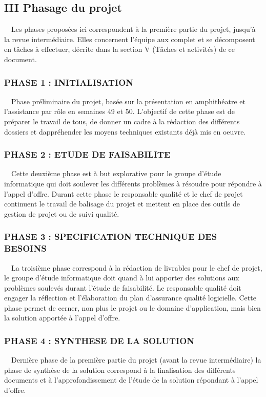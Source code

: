 \documentclass{article}
\begin{document}
\subsection[III Phasage du projet]{III Phasage du projet}
\ \ Les phases proposées ici correspondent à la première partie du
projet, jusqu’à la revue intermédiaire. Elles concernent l’équipe aux
complet et se décomposent en tâches à effectuer, décrite dans la
section V (Tâches et activités) de ce document.

\subsubsection[PHASE 1 : INITIALISATION]{PHASE 1 : INITIALISATION}
\ \ Phase préliminaire du projet, basée sur la présentation en
amphithéatre et l’assistance par rôle en semaines 49 et 50. L’objectif
de cette phase est de préparer le travail de tous, de donner un cadre à
la rédaction des différents dossiers et d{\textquotesingle}appréhender
les moyens techniques existants déjà mis en oeuvre.

\subsubsection[PHASE 2 : ETUDE DE FAISABILITE]{PHASE 2 : ETUDE DE
FAISABILITE}
\ \ Cette deuxième phase est à but explorative pour le groupe d’étude
informatique qui doit soulever les différents problèmes à résoudre pour
répondre à l’appel d’offre. Durant cette phase le responsable qualité
et le chef de projet continuent le travail de balisage du projet et
mettent en place des outils de gestion de projet ou de suivi qualité.

\subsubsection[PHASE 3 : SPECIFICATION TECHNIQUE DES BESOINS]{PHASE 3 :
SPECIFICATION TECHNIQUE DES BESOINS}
\ \ La troisième phase correspond à la rédaction de livrables pour le
chef de projet, le groupe d’étude informatique doit quand à lui
apporter des solutions aux problèmes soulevés durant l’étude de
faisabilité. Le responsable qualité doit engager la réflection et
l’élaboration du plan d’assurance qualité logicielle. Cette phase
permet de cerner, non plus le projet ou le domaine d’application, mais
bien la solution apportée à l’appel d’offre.

\subsubsection[PHASE 4 : SYNTHESE DE LA SOLUTION]{PHASE 4 : SYNTHESE DE
LA SOLUTION}
\ \ Dernière phase de la première partie du projet (avant la revue
intermédiaire) la phase de synthèse de la solution correspond à la
finalisation des différents documents et à l’approfondissement de
l’étude de la solution répondant à l’appel d’offre.
\end{document}
